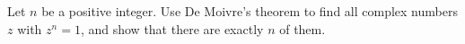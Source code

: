 Let $n$ be a positive integer. Use De Moivre's theorem to find all complex numbers $z$ with $z^n=1$, and show that there are exactly $n$ of them.
